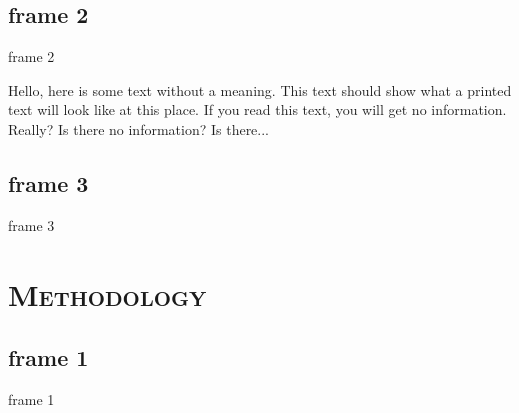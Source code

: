 \documentclass[xcolor=x11names,compress]{beamer}
\renewcommand{\(}{\begin{columns}}
\renewcommand{\)}{\end{columns}}
\newcommand{\<}[1]{\begin{column}{#1}}
\renewcommand{\>}{\end{column}}
\begin{document}
\subsection{frame 2}
\begin{frame}{frame 2}
\begin{multicols}{3}
Hello, here is some text without a meaning.  This text should show what 
a printed text will look like at this place.
If you read this text, you will get no information.  Really?  Is there 
no information?  Is there...
\end{multicols}
\end{frame}

\subsection{frame 3}
\begin{frame}{frame 3}

\end{frame}


\section{\scshape Methodology}
\subsection{frame 1}
\begin{frame}{frame 1}

\end{frame}
\end{document}
